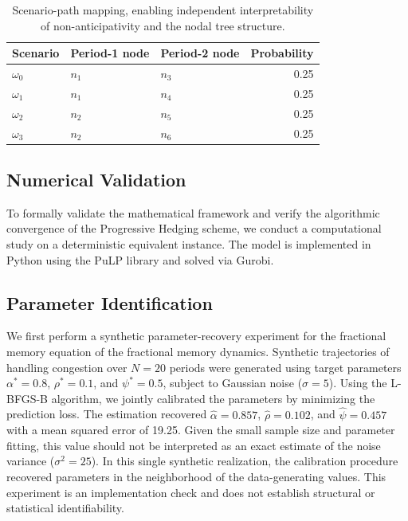 \documentclass[11pt,a4paper]{article}
\begin{document}
\begin{table}[ht]\small
\centering
\caption{Scenario-path mapping, enabling independent interpretability of non-anticipativity and the nodal tree structure.}
\begin{tabular}{lllr}
\toprule
Scenario & Period-1 node & Period-2 node & Probability \\
\midrule
$\omega_{0}$ & $n_{1}$ & $n_{3}$ & 0.25 \\
$\omega_{1}$ & $n_{1}$ & $n_{4}$ & 0.25 \\
$\omega_{2}$ & $n_{2}$ & $n_{5}$ & 0.25 \\
$\omega_{3}$ & $n_{2}$ & $n_{6}$ & 0.25 \\
\bottomrule
\end{tabular}
\label{tab:scenario_paths}
\end{table}

\label{sec:comp-study}

\subsection{Numerical Validation}
\label{ssec:numerical-validation}

To formally validate the mathematical framework and verify the algorithmic convergence of the Progressive Hedging scheme, we conduct a computational study on a deterministic equivalent instance. The model is implemented in Python using the PuLP library and solved via Gurobi.

\subsection{Parameter Identification}

We first perform a synthetic parameter-recovery experiment for the fractional memory equation of the fractional memory dynamics. Synthetic trajectories of handling congestion over \(N=20\) periods were generated using target parameters \(\alpha^*=0.8\), \(\rho^*=0.1\), and \(\psi^*=0.5\), subject to Gaussian noise (\(\sigma=5\)). Using the L-BFGS-B algorithm, we jointly calibrated the parameters by minimizing the prediction loss. The estimation recovered \(\widehat{\alpha}=0.857\), \(\widehat{\rho}=0.102\), and \(\widehat{\psi}=0.457\) with a mean squared error of 19.25. Given the small sample size and parameter fitting, this value should not be interpreted as an exact estimate of the noise variance (\(\sigma^2=25\)). In this single synthetic realization, the calibration procedure recovered parameters in the neighborhood of the data-generating values. This experiment is an implementation check and does not establish structural or statistical identifiability.
\end{document}
